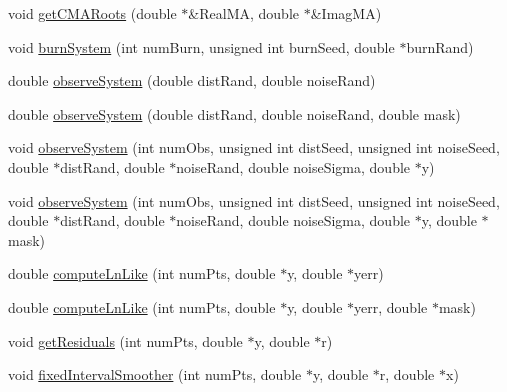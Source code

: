 \begin{DoxyCompactItemize}
\item 
void \hyperlink{class_c_a_r_m_a_a1d572ff7e85465abc3efb6ca1ac0cafc}{get\-C\-M\-A\-Roots} (double $\ast$\&Real\-M\-A, double $\ast$\&Imag\-M\-A)
\item 
void \hyperlink{class_c_a_r_m_a_a684661827088a58ccc3131184e7506ba}{burn\-System} (int num\-Burn, unsigned int burn\-Seed, double $\ast$burn\-Rand)
\item 
double \hyperlink{class_c_a_r_m_a_a12f0019ddf951e20ffda09e46795b8f3}{observe\-System} (double dist\-Rand, double noise\-Rand)
\item 
double \hyperlink{class_c_a_r_m_a_adbfdf1b311724e3a128613d880db66c5}{observe\-System} (double dist\-Rand, double noise\-Rand, double mask)
\item 
void \hyperlink{class_c_a_r_m_a_ad920bb6c62ce79b2ad5871bfcfe515de}{observe\-System} (int num\-Obs, unsigned int dist\-Seed, unsigned int noise\-Seed, double $\ast$dist\-Rand, double $\ast$noise\-Rand, double noise\-Sigma, double $\ast$y)
\item 
void \hyperlink{class_c_a_r_m_a_a083e1356ab030a2279a882b71eee26c1}{observe\-System} (int num\-Obs, unsigned int dist\-Seed, unsigned int noise\-Seed, double $\ast$dist\-Rand, double $\ast$noise\-Rand, double noise\-Sigma, double $\ast$y, double $\ast$mask)
\item 
double \hyperlink{class_c_a_r_m_a_acd0e0de5df0e6f26b87df72d0d5988e9}{compute\-Ln\-Like} (int num\-Pts, double $\ast$y, double $\ast$yerr)
\item 
double \hyperlink{class_c_a_r_m_a_aec17c78b88d909dba10342447915a89e}{compute\-Ln\-Like} (int num\-Pts, double $\ast$y, double $\ast$yerr, double $\ast$mask)
\item 
void \hyperlink{class_c_a_r_m_a_a2d84c0d953b15519cbddcfffc50132b0}{get\-Residuals} (int num\-Pts, double $\ast$y, double $\ast$r)
\item 
void \hyperlink{class_c_a_r_m_a_af5d31db7b37973d2dea0dae07ef531b5}{fixed\-Interval\-Smoother} (int num\-Pts, double $\ast$y, double $\ast$r, double $\ast$x)
\end{DoxyCompactItemize}
